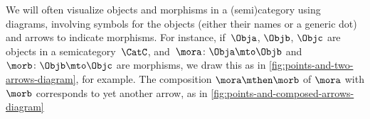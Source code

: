 \begin{marginfigure}
    \begin{center}
    \end{center}
    \caption{}
    \label{fig:points-and-two-arrows-diagram}
\end{marginfigure}

\begin{marginfigure}
    \begin{center}
    \end{center}
    \caption{}
    \label{fig:points-and-composed-arrows-diagram}
\end{marginfigure}

We will often visualize objects and morphisms in a (semi)category using diagrams, involving symbols for the objects (either their names or a generic dot) and arrows to indicate morphisms.
For instance, if~$\Obja$, $\Objb$, $\Objc$ are objects in a semicategory~$\CatC$, and~$\mora\colon \Obja \mto \Objb$ and $\morb\colon \Objb \mto \Objc$ are morphisms, we draw this as in \cref{fig:points-and-two-arrows-diagram}, for example.
The composition $\mora \mthen \morb$ of $\mora$ with $\morb$ corresponds to yet another arrow, as in \cref{fig:points-and-composed-arrows-diagram}

